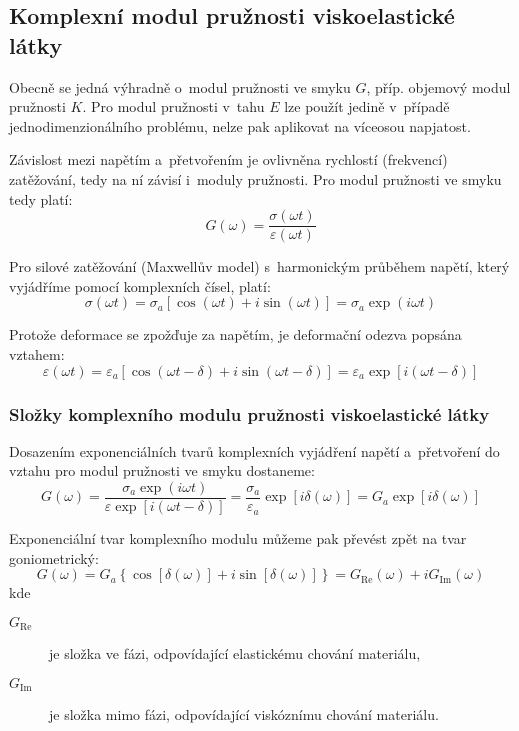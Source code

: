 
\subsection{Komplexní modul pružnosti viskoelastické látky}
Obecně se jedná výhradně o~modul pružnosti ve smyku $G$, příp. objemový modul pružnosti $K$.
Pro modul pružnosti v~tahu $E$ lze použít jedině v~případě jednodimenzionálního problému, nelze pak aplikovat na víceosou napjatost. 

Závislost mezi napětím a~přetvořením je ovlivněna rychlostí (frekvencí) zatěžování, tedy na ní závisí i~moduly pružnosti.
Pro modul pružnosti ve smyku tedy platí:
\begin{equation}
	G(\omega) = \frac{\sigma(\omega t)}{\varepsilon(\omega t)}
\end{equation}

Pro silové zatěžování (Maxwellův model) s~harmonickým průběhem napětí, který vyjádříme pomocí komplexních čísel, platí:
\begin{equation}
	\sigma(\omega t) = \sigma_a \left[\cos(\omega t) + i \sin(\omega t)\right] = \sigma_a \exp(i \omega t)
\end{equation}

Protože deformace se zpožďuje za napětím, je deformační odezva popsána vztahem:
\begin{equation}
	\varepsilon(\omega t) = \varepsilon_a \left[\cos(\omega t - \delta) + i \sin(\omega t - \delta)\right] = \varepsilon_a \exp[i (\omega t - \delta)]
\end{equation}

\subsubsection{Složky komplexního modulu pružnosti viskoelastické látky}
Dosazením exponenciálních tvarů komplexních vyjádření napětí a~přetvoření do vztahu pro modul pružnosti ve smyku dostaneme:
\begin{equation}
	G(\omega)
	= \frac{\sigma_a \exp(i \omega t)}{\varepsilon \exp\left[i(\omega t - \delta)\right]}
	= \frac{\sigma_a}{\varepsilon_a} \exp\left[i \delta(\omega)\right]
	= G_a \exp\left[i \delta(\omega)\right]
\end{equation}

Exponenciální tvar komplexního modulu můžeme pak převést zpět na tvar goniometrický:
\begin{equation}
	G(\omega)
	= G_a \left\{ \cos\left[\delta(\omega)\right] + i \sin\left[\delta(\omega)\right] \right\}
	= G_\text{Re}(\omega) + i G_\text{Im}(\omega)
\end{equation}
kde
\begin{description}
	\item[$G_\text{Re}$] je složka ve fázi, odpovídající elastickému chování materiálu,
	\item[$G_\text{Im}$] je složka mimo fázi, odpovídající viskóznímu chování materiálu.
\end{description}

